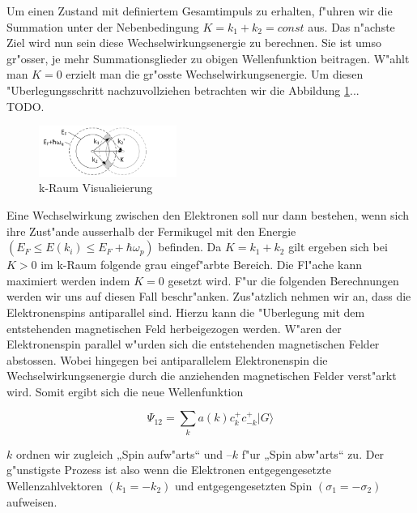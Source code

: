 \begin{refsection}
Um einen Zustand mit definiertem Gesamtimpuls zu erhalten, f"uhren wir die Summation unter der Nebenbedingung $K=k_1+k_2=const$ aus.
Das n"achste Ziel wird nun sein diese Wechselwirkungsenergie zu berechnen. Sie ist umso gr"osser, je mehr Summationsglieder zu obigen Wellenfunktion beitragen. W"ahlt man $K=0$ erzielt man die gr"osste Wechselwirkungsenergie. Um diesen "Uberlegungsschritt nachzuvollziehen betrachten wir die Abbildung \ref{supraleitung:kRaum_1}...
\\
TODO.
\begin{figure}[h]	
\centering
\includegraphics[width=0.4\textwidth]{supraleitung/kGraphic_05.png} %
\caption{k-Raum Visualieierung
\label{supraleitung:kRaum_1}}
\end{figure}
  
Eine Wechselwirkung zwischen den Elektronen soll nur dann bestehen, wenn sich ihre Zust"ande ausserhalb der Fermikugel mit den Energie $(E_F \le E(k_i) \le E_F+\hbar\omega_p)$ befinden. Da $K=k_1+k_2$ gilt ergeben sich bei $K>0$ im k-Raum folgende grau eingef"arbte Bereich. Die Fl"ache kann maximiert werden indem $K=0$ gesetzt wird. F"ur die folgenden Berechnungen werden wir uns auf diesen Fall beschr"anken.
Zus"atzlich nehmen wir an, dass die Elektronenspins antiparallel sind. Hierzu kann die "Uberlegung mit dem entstehenden magnetischen Feld herbeigezogen werden. W"aren der Elektronenspin parallel w"urden sich die entstehenden magnetischen Felder abstossen. Wobei hingegen bei antiparallelem Elektronenspin die Wechselwirkungsenergie durch die anziehenden magnetischen Felder verst"arkt wird.
Somit ergibt sich die neue Wellenfunktion

\[
\Psi_{12}=\sum \limits_{k} a(k)c^+_{k}c^+_{-k}|G\rangle
\]

$k$ ordnen wir zugleich „Spin aufw"arts“ und $–k$ f"ur „Spin abw"arts“ zu.
Der g"unstigste Prozess ist also wenn die Elektronen entgegengesetzte Wellenzahlvektoren $(k_1 = -k_2)$ und entgegengesetzten Spin $(\sigma_1 = -\sigma_2)$ aufweisen.
\\
\\
\printbibliography[heading=subbibliography]
\end{refsection}

